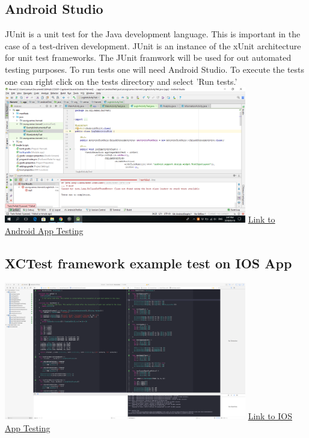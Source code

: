 \documentclass[12pt]{article}
\begin{document}
  \subsection{Android Studio}
JUnit is a unit test for the Java development language. This is important in the case of a test-driven development. JUnit is an instance of the xUnit architecture for unit test frameworks. The JUnit framwork will be used for out automated testing purposes. To run tests one will need Android Studio. To execute the tests one can right click on the tests directory and select 'Run tests.'\newline\newline
\includegraphics[width=400px]{images/FailedLoginTest}
\href{https://github.com/BinaryNinjaz/COS301-Capstone/blob/master/Source/Android/Harvest/app/src/androidTest/java/za/org/samac/harvest/LogInActivityTest.java}{Link to Android App Testing}
\newline
\subsection{ XCTest framework example test on IOS App}
\includegraphics[width=400px]{images/iostest}
\href{https://github.com/BinaryNinjaz/COS301-Capstone/tree/master/Source/iOS/Harvest/HarvestTests}{Link to IOS App Testing}
\newline
\end{document}
